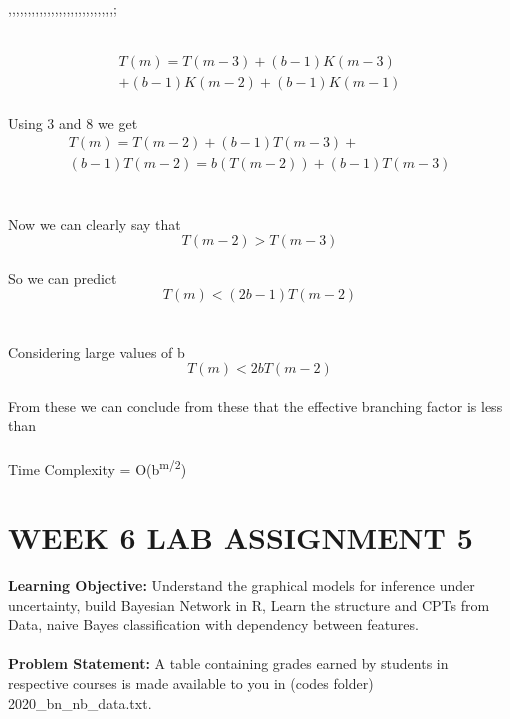 ,,,,,,,,,,,,,,,,,,,,,,,,,,,;\documentclass[conference]{IEEEtran}
\begin{document}
\\
\begin{equation}
\begin{split}
T(m) = T(m − 3) + (b − 1)K(m − 3)
\\+ (b − 1)K(m − 2)+ (b-1)K(m-1) \label{eq}
\end{split}
\end{equation}
\\
Using 3 and 8 we get
\\
\begin{equation}
\begin{split}
T(m) = T(m − 2) + (b − 1)T(m − 3) +
\\(b − 1)T(m − 2)= b(T(m-2)) + (b-1)T(m-3) \label{eq}
\end{split}
\end{equation}
\\
\\
Now we can clearly say that
\begin{equation}
T(m − 2) > T(m − 3) \label{eq}
\end{equation}
\\
So we can predict
\\
\begin{equation}
T(m) < (2b − 1)T(m − 2) \label{eq}
\end{equation}
\\
\\
Considering large values of b
\begin{equation}
T(m) < 2bT(m − 2) \label{eq}
\end{equation}
\\
From these we can conclude from these that the effective branching factor is less than 
\\
\\
Time Complexity  = O(b\textsuperscript{m/2})

\section{WEEK 6 LAB ASSIGNMENT 5}
\textbf{Learning Objective:}
Understand the graphical models for inference under uncertainty, build Bayesian Network in R, Learn the structure and CPTs from Data, naive Bayes classification with dependency between features.
\\
\\
\textbf{Problem Statement:}
A table containing grades earned by students in respective courses is made available to you in (codes folder) 2020\_bn\_nb\_data.txt.
\end{document}
